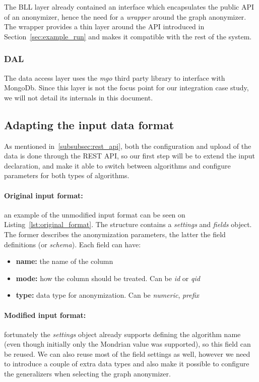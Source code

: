 The BLL layer already contained an interface which encapsulates the public API of an anonymizer, hence the need for a \emph{wrapper} around the graph anonymizer. The wrapper provides a thin layer around the API introduced in Section~\ref{sec:example_run} and makes it compatible with the rest of the system.

\subsubsection{DAL}
The data access layer uses the \emph{mgo} third party library to interface with MongoDb. Since this layer is not the focus point for our integration case study, we will not detail its internals in this document.

\subsection{Adapting the input data format}\label{subsec:json_input_format}
As mentioned in~\ref{subsubsec:rest_api}, both the configuration and upload of the data is done through the REST API, so our first step will be to extend the input declaration, and make it able to switch between algorithms and configure parameters for both types of algorithms.

\paragraph{Original input format:} an example of the unmodified input format can be seen on Listing~\ref{lst:original_format}. The structure contains a \textit{settings} and \textit{fields} object. The former describes the anonymization parameters, the latter the field definitions (or \emph{schema}). Each field can have:
\begin{itemize}
    \item \textbf{name:} the name of the column
    \item \textbf{mode:} how the column should be treated. Can be \textit{id} or \textit{qid}
    \item \textbf{type:} data type for anonymization. Can be \textit{numeric}, \textit{prefix}
\end{itemize}

\vspace{\baselineskip}


\paragraph{Modified input format:} fortunately the \textit{settings} object already supports defining the algorithm name (even though initially only the Mondrian value was supported), so this field can be reused. We can also reuse most of the field settings as well, however we need to introduce a couple of extra data types and also make it possible to configure the generalizers when selecting the graph anonymizer.

